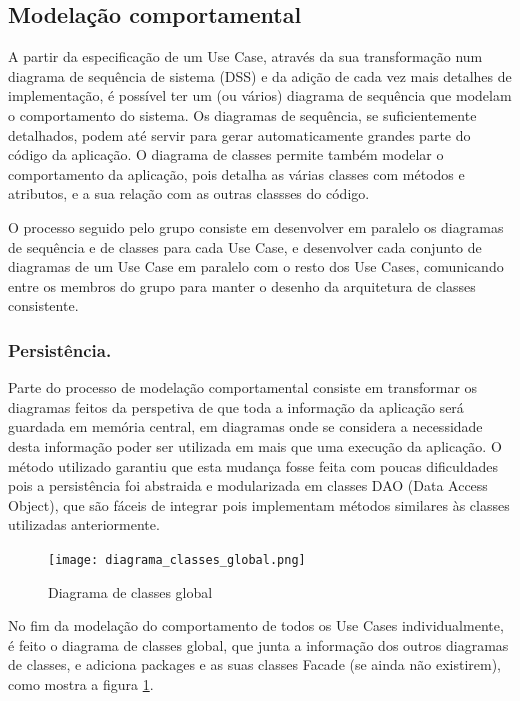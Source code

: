 \documentclass{llncs}
\begin{document}
\subsection{Modelação comportamental}

A partir da especificação de um Use Case, através da sua transformação num diagrama de sequência de sistema (DSS) e da adição de cada vez mais detalhes de implementação, é possível ter um (ou vários) diagrama de sequência que modelam o comportamento do sistema. Os diagramas de sequência, se suficientemente detalhados, podem até servir para gerar automaticamente grandes parte do código da aplicação. O diagrama de classes permite também modelar o comportamento da aplicação, pois detalha as várias classes com métodos e atributos, e a sua relação com as outras classses do código.

O processo seguido pelo grupo consiste em desenvolver em paralelo os diagramas de sequência e de classes para cada Use Case, e desenvolver cada conjunto de diagramas de um Use Case em paralelo com o resto dos Use Cases, comunicando entre os membros do grupo para manter o desenho da arquitetura de classes consistente.

\subsubsection{Persistência.} %

Parte do processo de modelação comportamental consiste em transformar os diagramas feitos da perspetiva de que toda a informação da aplicação será guardada em memória central, em diagramas onde se considera a necessidade desta informação poder ser utilizada em mais que uma execução da aplicação. O método utilizado garantiu que esta mudança fosse feita com poucas dificuldades pois a persistência foi abstraida e modularizada em classes DAO (Data Access Object), que são fáceis de integrar pois implementam métodos similares às classes utilizadas anteriormente.

\begin{figure}
\begin{center}
\texttt{[image: diagrama\_classes\_global.png]}
\end{center}
\caption{\label{fig:diagrama_classes_global}Diagrama de classes global}
\end{figure}

No fim da modelação do comportamento de todos os Use Cases individualmente, é feito o diagrama de classes global, que junta a informação dos outros diagramas de classes, e adiciona packages e as suas classes Facade (se ainda não existirem), como mostra a figura \ref{fig:diagrama_classes_global}.
\end{document}
